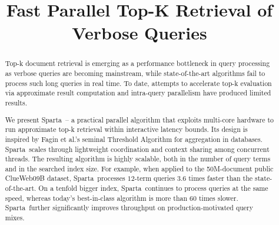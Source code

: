 \documentclass[sigconf]{acmart}
\begin{document}
\newcommand{\alg}{Sparta}  
\newcommand{\inred}[1]{{\color{red}{#1}}}
\newcommand{\inblue}[1]{{\color{blue}{#1}}}
\newcommand{\remove}[1]{}


\title{Fast Parallel Top-K Retrieval of Verbose Queries}


\author{ }




\begin{abstract}
Top-k document retrieval is emerging as a performance bottleneck in query processing as verbose queries are becoming 
mainstream, while state-of-the-art algorithms fail to process such long queries in real time. To date, attempts to
accelerate top-k evaluation 
via approximate result computation and intra-query parallelism have produced limited results. 

We present \alg\ -- a practical parallel algorithm that exploits multi-core hardware to run approximate top-k retrieval 
within interactive latency bounds. Its design is inspired by  Fagin et al.'s seminal Threshold Algorithm for  aggregation in databases. 
\alg\ scales through lightweight coordination and context sharing among concurrent threads. The resulting algorithm 
is highly scalable, 
both in the number of query terms and in the searched index size. For example, when applied to the 50M-document public ClueWeb09B 
dataset, \alg\  processes $12$-term queries $3.6$ times faster than the state-of-the-art. On a tenfold  bigger index, 
\alg\ continues to process queries at the same speed, whereas today's best-in-class algorithm is more than 60 times slower. 
\alg\ further significantly improves throughput on production-motivated query mixes. 
\end{abstract}

\maketitle











  
\end{document}
